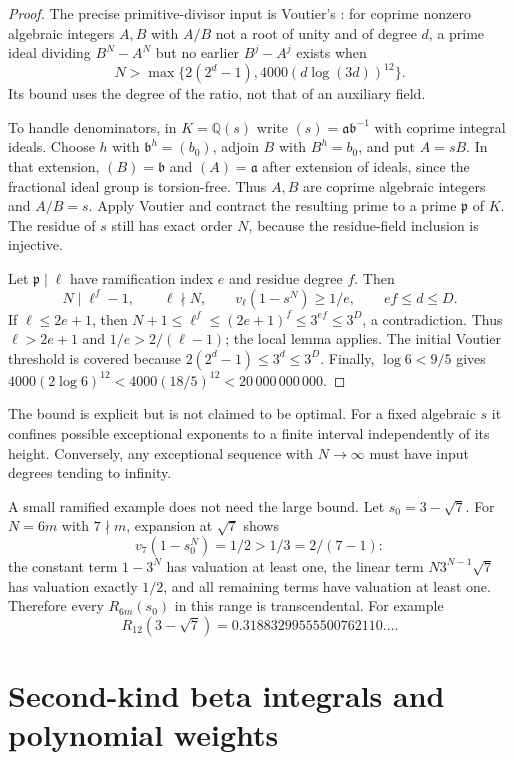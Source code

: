 \documentclass[11pt,a4paper]{article}
\theoremstyle{definition}
\theoremstyle{remark}
\numberwithin{equation}{section}
\begin{document}
\begin{proof}
The precise primitive-divisor input is Voutier's
\cite[Theorem~2(i)]{beta-voutier}: for coprime nonzero algebraic
integers $A,B$ with $A/B$ not a root of unity and of degree $d$, a
prime ideal dividing $B^N-A^N$ but no earlier $B^j-A^j$ exists when
\[
N>\max\{2(2^d-1),4000(d\log(3d))^{12}\}.
\]
Its bound uses the degree of the ratio, not that of an auxiliary field.

To handle denominators, in $K=\mathbb Q(s)$ write
$(s)=\mathfrak a\mathfrak b^{-1}$ with coprime integral ideals.
Choose $h$ with $\mathfrak b^h=(b_0)$, adjoin $B$ with $B^h=b_0$, and
put $A=sB$.  In that extension, $(B)=\mathfrak b$ and $(A)=\mathfrak a$
after extension of ideals, since the fractional ideal group is
torsion-free.  Thus $A,B$ are coprime algebraic integers and $A/B=s$.
Apply Voutier and contract the resulting prime to a prime
$\mathfrak p$ of $K$.  The residue of $s$ still has exact order $N$,
because the residue-field inclusion is injective.

Let $\mathfrak p\mid\ell$ have ramification index $e$ and residue
degree $f$.  Then
\[
N\mid\ell^f-1,\qquad \ell\nmid N,\qquad
v_\ell(1-s^N)\ge1/e,\qquad ef\le d\le D.
\]
If $\ell\le2e+1$, then
$N+1\le\ell^f\le(2e+1)^f\le3^{ef}\le3^D$, a contradiction.
Thus $\ell>2e+1$ and $1/e>2/(\ell-1)$; the local lemma applies.
The initial Voutier threshold is covered because
$2(2^d-1)\le3^d\le3^D$.  Finally,
$\log6<9/5$ gives
$4000(2\log6)^{12}<4000(18/5)^{12}<20\,000\,000\,000$.
\end{proof}

The bound is explicit but is not claimed to be optimal.  For a fixed
algebraic $s$ it confines possible exceptional exponents to a finite
interval independently of its height.  Conversely, any exceptional
sequence with $N\to\infty$ must have input degrees tending to infinity.

A small ramified example does not need the large bound.  Let
$s_0=3-\sqrt7$.  For $N=6m$ with $7\nmid m$, expansion at $\sqrt7$
shows
\[
v_7(1-s_0^N)=1/2>1/3=2/(7-1):
\]
the constant term $1-3^N$ has valuation at least one, the linear term
$N3^{N-1}\sqrt7$ has valuation exactly $1/2$, and all remaining terms
have valuation at least one.  Therefore every $R_{6m}(s_0)$ in this
range is transcendental.  For example
\[
R_{12}(3-\sqrt7)=0.31883299555500762110\ldots.
\]

\section{Second-kind beta integrals and polynomial weights}
\label{beta-sec-secondkind}
\end{document}
